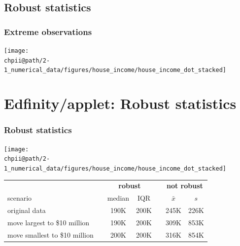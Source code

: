 \documentclass[slidestop,compress,mathserif]{beamer}
\makeatletter
\def\chpii@path{../../Chp 2}
\makeatother
\begin{document}
\subsection{Robust statistics}


\begin{frame}
\frametitle{Extreme observations}


\begin{center}
\texttt{[image: \\chpii@path/2-1\_numerical\_data/figures/house\_income/house\_income\_dot\_stacked]}
\end{center}

\end{frame}


\section{Edfinity/applet: Robust statistics}

\begin{frame}
\frametitle{Robust statistics}

\begin{center}
\texttt{[image: \\chpii@path/2-1\_numerical\_data/figures/house\_income/house\_income\_dot\_stacked]}
\end{center}

{\small
\begin{center}
\begin{tabular}{l c cc c cc}
  \hline
& \hspace{0mm} & \multicolumn{2}{c}{\bf robust} & \hspace{2mm} & \multicolumn{2}{c}{\bf not robust} \\
scenario && median & IQR && $\bar{x}$ & $s$ \\ 
  \hline
original data && 190K & 200K && 245K & 226K \\ 
move largest to \$10 million && 190K & 200K && 309K & 853K \\ 
move smallest to \$10 million && 200K & 200K && 316K & 854K \\ 
   \hline
\end{tabular}
\end{center}
}

\end{frame}
\end{document}
